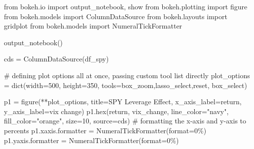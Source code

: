 \documentclass[
  letterpaper,
  DIV=11,
  numbers=noendperiod]{scrreprt}
\newenvironment{Shaded}{\begin{snugshade}}{\end{snugshade}}
\newcommand{\BuiltInTok}[1]{\textcolor[rgb]{0.00,0.23,0.31}{#1}}
\newcommand{\CommentTok}[1]{\textcolor[rgb]{0.37,0.37,0.37}{#1}}
\newcommand{\DecValTok}[1]{\textcolor[rgb]{0.68,0.00,0.00}{#1}}
\newcommand{\ImportTok}[1]{\textcolor[rgb]{0.00,0.46,0.62}{#1}}
\newcommand{\NormalTok}[1]{\textcolor[rgb]{0.00,0.23,0.31}{#1}}
\newcommand{\OperatorTok}[1]{\textcolor[rgb]{0.37,0.37,0.37}{#1}}
\newcommand{\StringTok}[1]{\textcolor[rgb]{0.13,0.47,0.30}{#1}}
\begin{document}
\begin{Shaded}
\begin{Highlighting}[]
\ImportTok{from}\NormalTok{ bokeh.io }\ImportTok{import}\NormalTok{ output\_notebook, show}
\ImportTok{from}\NormalTok{ bokeh.plotting }\ImportTok{import}\NormalTok{ figure}
\ImportTok{from}\NormalTok{ bokeh.models }\ImportTok{import}\NormalTok{ ColumnDataSource}
\ImportTok{from}\NormalTok{ bokeh.layouts }\ImportTok{import}\NormalTok{ gridplot}
\ImportTok{from}\NormalTok{ bokeh.models }\ImportTok{import}\NormalTok{ NumeralTickFormatter}

\NormalTok{output\_notebook()}

\NormalTok{cds }\OperatorTok{=}\NormalTok{ ColumnDataSource(df\_spy)}

\CommentTok{\# defining plot options all at once, passing custom tool list directly}
\NormalTok{plot\_options }\OperatorTok{=} \BuiltInTok{dict}\NormalTok{(width}\OperatorTok{=}\DecValTok{500}\NormalTok{, height}\OperatorTok{=}\DecValTok{350}\NormalTok{, tools}\OperatorTok{=}\StringTok{\textquotesingle{}box\_zoom,lasso\_select,reset, box\_select\textquotesingle{}}\NormalTok{)}

\NormalTok{p1 }\OperatorTok{=}\NormalTok{ figure(}\OperatorTok{**}\NormalTok{plot\_options, title}\OperatorTok{=}\StringTok{\textquotesingle{}SPY Leverage Effect\textquotesingle{}}\NormalTok{, x\_axis\_label}\OperatorTok{=}\StringTok{\textquotesingle{}return\textquotesingle{}}\NormalTok{, y\_axis\_label}\OperatorTok{=}\StringTok{\textquotesingle{}vix change\textquotesingle{}}\NormalTok{)}
\NormalTok{p1.}\BuiltInTok{hex}\NormalTok{(}\StringTok{\textquotesingle{}return\textquotesingle{}}\NormalTok{, }\StringTok{\textquotesingle{}vix\_change\textquotesingle{}}\NormalTok{, line\_color}\OperatorTok{=}\StringTok{"navy"}\NormalTok{, fill\_color}\OperatorTok{=}\StringTok{"orange"}\NormalTok{, size}\OperatorTok{=}\DecValTok{10}\NormalTok{, source}\OperatorTok{=}\NormalTok{cds)}
\CommentTok{\# formatting the x{-}axis and y{-}axis to percents}
\NormalTok{p1.xaxis.formatter }\OperatorTok{=}\NormalTok{ NumeralTickFormatter(}\BuiltInTok{format}\OperatorTok{=}\StringTok{\textquotesingle{}0\%\textquotesingle{}}\NormalTok{) }
\NormalTok{p1.yaxis.formatter }\OperatorTok{=}\NormalTok{ NumeralTickFormatter(}\BuiltInTok{format}\OperatorTok{=}\StringTok{\textquotesingle{}0\%\textquotesingle{}}\NormalTok{)}


\end{Highlighting}
\end{Shaded}
\end{document}
